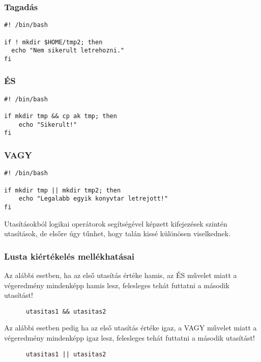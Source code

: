 \bigskip
\begin{minipage}{0.425\textwidth}

\subsubsection*{Tagadás}
\lstset{linewidth=\textwidth}
\begin{lstlisting}
#! /bin/bash

if ! mkdir $HOME/tmp2; then
  echo "Nem sikerult letrehozni."
fi
\end{lstlisting}
\end{minipage}
\hspace{1em}
\begin{minipage}{0.425\textwidth}
\lstset{linewidth=\textwidth}
\subsubsection*{ÉS}
\begin{lstlisting}
#! /bin/bash

if mkdir tmp && cp ak tmp; then
    echo "Sikerult!"
fi
\end{lstlisting}
\end{minipage}
\subsubsection*{VAGY}
\begin{lstlisting}
#! /bin/bash

if mkdir tmp || mkdir tmp2; then
    echo "Legalabb egyik konyvtar letrejott!"
fi
\end{lstlisting}

\noindent Utasításokból logikai operátorok segítségével képzett kifejezések szintén utasítások, de elsőre úgy tűnhet, hogy talán kissé különösen viselkednek.
\vfill\pagebreak

\subsubsection*{Lusta kiértékelés mellékhatásai}
Az alábbi esetben, ha az első utasítás értéke hamis, az ÉS művelet miatt a végeredmény mindenképp hamis lesz, felesleges tehát futtatni a második utasítást!
\begin{lstlisting}
      utasitas1 && utasitas2
\end{lstlisting}


\noindent Az alábbi esetben pedig ha az első utasítás értéke igaz, a VAGY művelet miatt a végeredmény mindenképp igaz lesz, felesleges tehát futtatni a második utasítást!
\begin{lstlisting}
      utasitas1 || utasitas2
\end{lstlisting}


